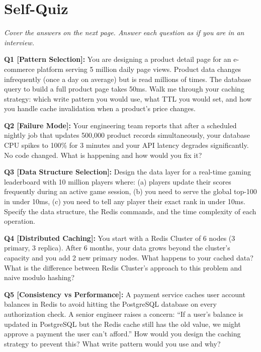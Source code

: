 \documentclass[11pt,a4paper]{article}
\begin{document}
\newpage
\section*{Self-Quiz}

\textit{Cover the answers on the next page. Answer each question as if you are in an interview.}

\vspace{8pt}

\begin{quizbox}
\textbf{Q1 [Pattern Selection]:} You are designing a product detail page for an e-commerce platform serving 5 million daily page views. Product data changes infrequently (once a day on average) but is read millions of times. The database query to build a full product page takes 50ms. Walk me through your caching strategy: which write pattern you would use, what TTL you would set, and how you handle cache invalidation when a product's price changes.

\vspace{10pt}

\textbf{Q2 [Failure Mode]:} Your engineering team reports that after a scheduled nightly job that updates 500,000 product records simultaneously, your database CPU spikes to 100\% for 3 minutes and your API latency degrades significantly. No code changed. What is happening and how would you fix it?

\vspace{10pt}

\textbf{Q3 [Data Structure Selection]:} Design the data layer for a real-time gaming leaderboard with 10 million players where: (a) players update their scores frequently during an active game session, (b) you need to serve the global top-100 in under 10ms, (c) you need to tell any player their exact rank in under 10ms. Specify the data structure, the Redis commands, and the time complexity of each operation.

\vspace{10pt}

\textbf{Q4 [Distributed Caching]:} You start with a Redis Cluster of 6 nodes (3 primary, 3 replica). After 6 months, your data grows beyond the cluster's capacity and you add 2 new primary nodes. What happens to your cached data? What is the difference between Redis Cluster's approach to this problem and naive modulo hashing?

\vspace{10pt}

\textbf{Q5 [Consistency vs Performance]:} A payment service caches user account balances in Redis to avoid hitting the PostgreSQL database on every authorization check. A senior engineer raises a concern: ``If a user's balance is updated in PostgreSQL but the Redis cache still has the old value, we might approve a payment the user can't afford.'' How would you design the caching strategy to prevent this? What write pattern would you use and why?
\end{quizbox}
\end{document}
